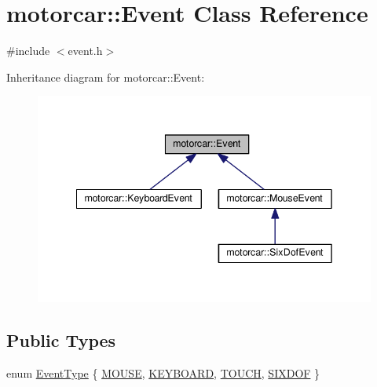 \hypertarget{classmotorcar_1_1Event}{\section{motorcar\-:\-:Event Class Reference}
\label{classmotorcar_1_1Event}
}


{\ttfamily \#include $<$event.\-h$>$}



Inheritance diagram for motorcar\-:\-:Event\-:
\nopagebreak
\begin{figure}[H]
\begin{center}
\leavevmode
\includegraphics[width=342pt]{classmotorcar_1_1Event__inherit__graph}
\end{center}
\end{figure}
\subsection*{Public Types}
\begin{DoxyCompactItemize}
\item 
enum \hyperlink{classmotorcar_1_1Event_af4f5d9ed7dc2d8a2324fa5b0d32c29b0}{Event\-Type} \{ \hyperlink{classmotorcar_1_1Event_af4f5d9ed7dc2d8a2324fa5b0d32c29b0a03dadb42ea3036c0a8b1bfa6fac4072e}{M\-O\-U\-S\-E}, 
\hyperlink{classmotorcar_1_1Event_af4f5d9ed7dc2d8a2324fa5b0d32c29b0a6a50b4eb2b4d2086997bc94fc075d4c9}{K\-E\-Y\-B\-O\-A\-R\-D}, 
\hyperlink{classmotorcar_1_1Event_af4f5d9ed7dc2d8a2324fa5b0d32c29b0a71e14a650a78d42baa12a22e5cd4ad00}{T\-O\-U\-C\-H}, 
\hyperlink{classmotorcar_1_1Event_af4f5d9ed7dc2d8a2324fa5b0d32c29b0a2123b3dacd834d3d4d60b38b1d517165}{S\-I\-X\-D\-O\-F}
 \}
\end{DoxyCompactItemize}
